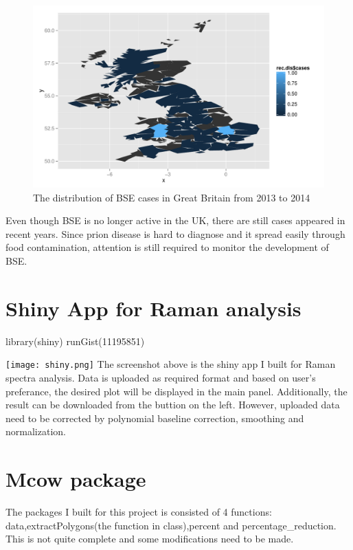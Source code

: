 \documentclass{article}\usepackage[]{graphicx}\usepackage[]{color}
\newenvironment{knitrout}{}{} %
\begin{document}
\begin{knitrout}
\begin{figure}[H]
\includegraphics[width=\textwidth]{figure/recent} \caption[The distribution of BSE cases in Great Britain from 2013 to 2014]{The distribution of BSE cases in Great Britain from 2013 to 2014\label{fig:recent}}
\end{figure}


\end{knitrout}

Even though BSE is no longer active in the UK, there are still cases appeared in recent years. Since prion disease is hard to diagnose and it spread easily through food contamination, attention is still required to monitor the development of BSE.

\section{Shiny App for Raman analysis}

library(shiny)
runGist(11195851)

\texttt{[image: shiny.png]}
The screenshot above is the shiny app I built for Raman spectra analysis. Data is uploaded as required format and based on user's preferance, the desired plot will be displayed in the main panel. Additionally, the result can be downloaded from the buttion on the left. However, uploaded data need to be corrected by polynomial baseline correction, smoothing and normalization.
 
\section{Mcow package}
The packages I built for this project is consisted of 4 functions: data,extractPolygons(the function in class),percent and percentage_reduction. This is not quite complete and some modifications need to be made.
\end{document}
